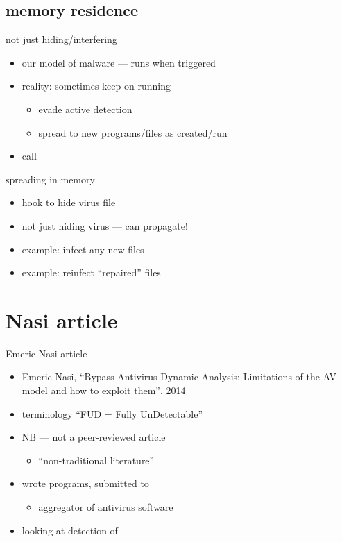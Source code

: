 \subsection{memory residence}

\begin{frame}{not just hiding/interfering}
    \begin{itemize}
    \item our model of malware --- runs when triggered
    \item reality: sometimes keep on running
        \begin{itemize}
        \item evade active detection
        \item spread to new programs/files as created/run
        \end{itemize}
    \item call 
    \end{itemize}
\end{frame}

\begin{frame}{spreading in memory}
    \begin{itemize}
    \item hook to hide virus file
    \item not just hiding virus --- can propagate!
    \item example: infect any new files
    \item example: reinfect ``repaired'' files
    \end{itemize}
\end{frame}

\section{Nasi article}

\begin{frame}{Emeric Nasi article}
    \begin{itemize}
    \item Emeric Nasi, ``Bypass Antivirus Dynamic Analysis: Limitations of the AV model and how to exploit them'', 2014
    \item terminology ``FUD = Fully UnDetectable''
    \item NB --- not a peer-reviewed article
        \begin{itemize}
        \item ``non-traditional literature''
        \end{itemize}
    \item wrote programs, submitted to 
        \begin{itemize}
        \item aggregator of antivirus software
        \end{itemize}
    \item looking at detection of 
    \end{itemize}
\end{frame}


